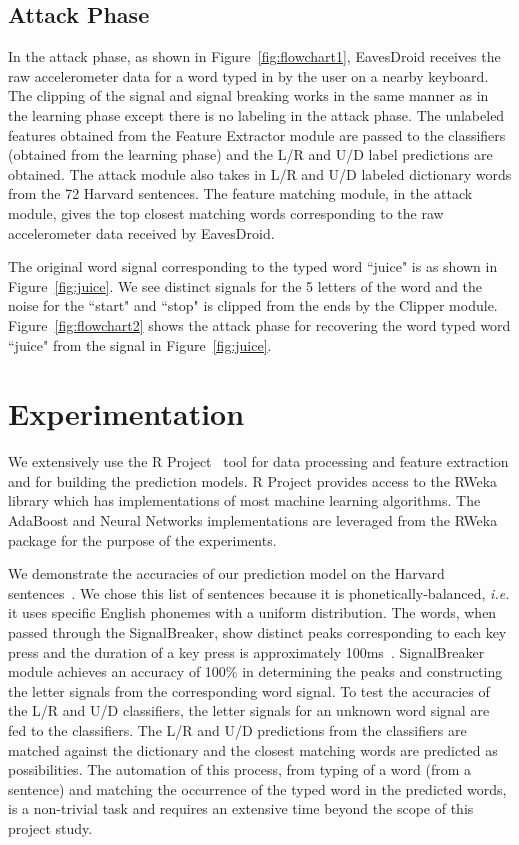 \documentclass[11pt,conference]{IEEEtran}
\begin{document}
\subsection{Attack Phase}
\label{sec:attacking}
In the attack phase, as shown in Figure~\ref{fig:flowchart1}, EavesDroid receives the raw accelerometer data for a word
typed in by the user on a nearby keyboard. The clipping of the signal and signal breaking
works in the same manner as in the learning phase except there is no labeling in the attack
phase. The unlabeled features obtained from the Feature Extractor module are passed
to the classifiers (obtained from the learning phase) and the L/R and U/D label predictions
are obtained. The attack module also takes in L/R and U/D labeled dictionary words from the
72 Harvard sentences. The feature matching module, in the attack module, gives the top
closest matching words corresponding to the raw accelerometer data received by EavesDroid.

The original word signal corresponding to the typed word ``juice" is as shown in Figure~\ref{fig:juice}.
We see distinct signals for the 5 letters of the word and the noise for the ``start" and ``stop" is clipped
from the ends by the Clipper module. Figure~\ref{fig:flowchart2} shows the attack phase for recovering
the word typed word ``juice" from the signal in Figure~\ref{fig:juice}.

\section{Experimentation}
\label{sec:experimentation}
We extensively use the R Project~\cite{r-project} tool for data processing and feature extraction and for building the prediction models. R Project
provides access to the RWeka~\cite{rweka} library which has implementations
of most machine learning algorithms. The AdaBoost and Neural Networks implementations
are leveraged from the RWeka package for the purpose of the experiments.

We demonstrate the accuracies of our prediction model on the Harvard
sentences~\cite{harvard-sentences}. We chose this list of sentences because
it is phonetically-balanced, \emph{i.e.} it uses specific English phonemes
with a uniform distribution. The words, when passed through the SignalBreaker,
show distinct peaks corresponding to each key press and
the duration of a key press is approximately 100ms~\cite{spiphone}.
SignalBreaker module achieves an accuracy of 100\% in
determining the peaks and constructing the letter signals from the corresponding word
signal. To test the accuracies of the L/R and U/D classifiers, the letter signals
for an unknown word signal are fed to the classifiers. The L/R and U/D predictions
from the classifiers are matched against the dictionary and the closest matching
words are predicted as possibilities. The automation of this process, from typing
of a word (from a sentence) and matching the occurrence of the typed word in the
predicted words, is a non-trivial task and requires an extensive time beyond the scope
of this project study.
\end{document}
